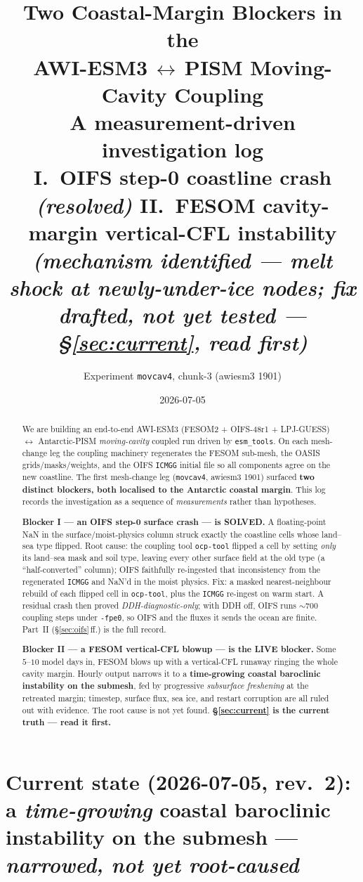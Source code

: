 \documentclass[11pt,a4paper]{article}
\title{\vspace{-1.5em}\textbf{Two Coastal-Margin Blockers in the\\ AWI-ESM3\,$\leftrightarrow$\,PISM Moving-Cavity Coupling}\\[0.3em]
\large A measurement-driven investigation log\\[0.25em]
\normalsize \textbf{I.}~OIFS step-0 coastline crash \emph{(resolved)} \quad\textbullet\quad \textbf{II.}~FESOM cavity-margin vertical-CFL instability \emph{(mechanism identified --- melt shock at newly-under-ice nodes; fix drafted, not yet tested --- \S\ref{sec:current}, read first)}}
\author{Experiment \texttt{movcav4}, chunk-3 (awiesm3 1901)}
\date{2026-07-05}
\newcommand{\code}[1]{\texttt{\small #1}}
\begin{document}
\maketitle
\thispagestyle{fancy}

\begin{abstract}
\noindent
We are building an end-to-end AWI-ESM3 (FESOM2 + OIFS-48r1 + LPJ-GUESS) $\leftrightarrow$
Antarctic-PISM \emph{moving-cavity} coupled run driven by \code{esm\_tools}. On each
mesh-change leg the coupling machinery regenerates the FESOM sub-mesh, the OASIS
grids/masks/weights, and the OIFS \code{ICMGG} initial file so all components agree on the
new coastline. The first mesh-change leg (\code{movcav4}, awiesm3 1901) surfaced \textbf{two
distinct blockers, both localised to the Antarctic coastal margin}. This log records the
investigation as a sequence of \emph{measurements} rather than hypotheses.

\smallskip\noindent
\textbf{Blocker I --- an OIFS step-0 surface crash --- is SOLVED.} A floating-point NaN in
the surface/moist-physics column struck exactly the coastline cells whose land--sea type
flipped. Root cause: the coupling tool \code{ocp-tool} flipped a cell by setting \emph{only}
its land--sea mask and soil type, leaving every other surface field at the old type (a
``half-converted'' column); OIFS faithfully re-ingested that inconsistency from the
regenerated \code{ICMGG} and NaN'd in the moist physics. Fix: a masked nearest-neighbour
rebuild of each flipped cell in \code{ocp-tool}, plus the \code{ICMGG} re-ingest on warm
start. A residual crash then proved \emph{DDH-diagnostic-only}; with DDH off, OIFS runs
$\sim$700 coupling steps under \code{-fpe0}, so OIFS and the fluxes it sends the ocean are
finite. Part~II (\S\ref{sec:oifs}\,ff.) is the full record.

\smallskip\noindent
\textbf{Blocker II --- a FESOM vertical-CFL blowup --- is the LIVE blocker.} Some $5$--$10$
model days in, FESOM blows up with a vertical-CFL runaway ringing the whole cavity margin.
Hourly output narrows it to a \textbf{time-growing coastal baroclinic instability on the
submesh}, fed by progressive \emph{subsurface freshening} at the retreated margin; timestep,
surface flux, sea ice, and restart corruption are all ruled out with evidence. The root
cause is not yet found. \textbf{\S\ref{sec:current} is the current truth --- read it first.}
\end{abstract}

\section{Current state (2026-07-05, rev.~2): a \emph{time-growing} coastal baroclinic instability on the submesh --- \emph{narrowed, not yet root-caused}}\label{sec:current}
\end{document}

